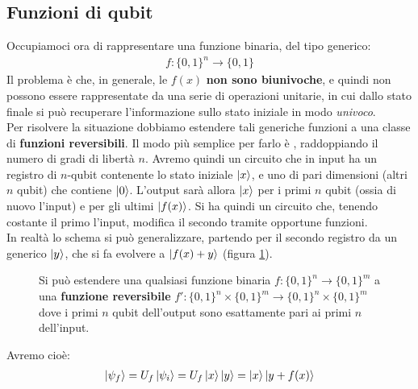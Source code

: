 \documentclass[../../InformazioneQuantistica.tex]{subfiles}
\begin{document}
\subsection{Funzioni di qubit}
Occupiamoci ora di rappresentare una funzione binaria, del tipo generico:
\begin{align*}
f: \{0,1\}^n \to \{0,1\}
\end{align*}
Il problema è che, in generale, le $f(x)$ \textbf{non sono biunivoche}, e quindi non possono essere rappresentate da una serie di operazioni unitarie, in cui dallo stato finale si può recuperare l'informazione sullo stato iniziale in modo \textit{univoco}.\\
Per risolvere la situazione dobbiamo estendere tali generiche funzioni a una classe di \textbf{funzioni reversibili}. Il modo più semplice per farlo è , raddoppiando il numero di gradi di libertà $n$. Avremo quindi un circuito che in input ha un registro di $n$-qubit contenente lo stato iniziale $\Ket{x}$, e uno di pari dimensioni (altri $n$ qubit) che contiene $\Ket{0}$. L'output sarà allora $\Ket{x}$ per i primi $n$ qubit (ossia di nuovo l'input) e per gli ultimi $\Ket{f(x)}$. Si ha quindi un circuito che, tenendo costante il primo l'input, modifica il secondo tramite opportune funzioni.\\
In realtà lo schema si può generalizzare, partendo per il secondo registro da un generico $\Ket{y}$, che si fa evolvere a $\Ket{f(x) + y}$ (figura \ref{fig:computazione-reversibile}).

\begin{figure}[H]
\centering

\caption{Si può estendere una qualsiasi funzione binaria $f:\{0,1\}^n \to \{0,1\}^m$ a una \textbf{funzione reversibile} $f':\{0,1\}^n \times \{0,1\}^m \to \{0,1\}^n \times \{0,1\}^m$ dove i primi $n$ qubit dell'output sono esattamente pari ai primi $n$ dell'input.\label{fig:computazione-reversibile}}
\end{figure}

Avremo cioè:
\begin{align*}
\Ket{\psi_f} = U_f\Ket{\psi_i} = U_f \Ket{x}\Ket{y} = \Ket{x}\Ket{y + f(x)}
\end{align*}
\end{document}
